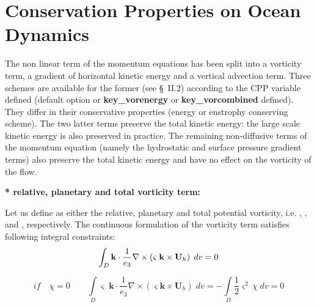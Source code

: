 \documentclass[NEMO_book]{subfiles}
\begin{document}
\section{Conservation Properties on Ocean Dynamics}
\label{Invariant_dyn}

The non linear term of the momentum equations has been split into a 
vorticity term, a gradient of horizontal kinetic energy and a vertical 
advection term. Three schemes are available for the former (see {\S}~II.2) 
according to the CPP variable defined (default option\textbf{ 
}or \textbf{key{\_}vorenergy } or \textbf{key{\_}vorcombined 
} defined). They differ in their conservative 
properties (energy or enstrophy conserving scheme). The two latter terms 
preserve the total kinetic energy: the large scale kinetic energy is also 
preserved in practice. The remaining non-diffusive terms of the momentum 
equation (namely the hydrostatic and surface pressure gradient terms) also 
preserve the total kinetic energy and have no effect on the vorticity of the 
flow.

\textbf{* relative, planetary and total vorticity term:}

Let us define as either the relative, planetary and total potential 
vorticity, i.e. , , and , respectively. The continuous formulation of the 
vorticity term satisfies following integral constraints:
\begin{equation} \label{Eq_vor_vorticity}
\int_D {{\textbf {k}}\cdot \frac{1}{e_3 }\nabla \times \left( {\varsigma 
\;{\rm {\bf k}}\times {\textbf {U}}_h } \right)\;dv} =0
\end{equation}

\begin{equation} \label{Eq_vor_enstrophy}
if\quad \chi =0\quad \quad \int\limits_D {\varsigma \;{\textbf{k}}\cdot 
\frac{1}{e_3 }\nabla \times \left( {\varsigma {\textbf{k}}\times {\textbf{U}}_h } \right)\;dv} =-\int\limits_D {\frac{1}{2}\varsigma ^2\,\chi \;dv} 
=0
\end{equation}
\end{document}
